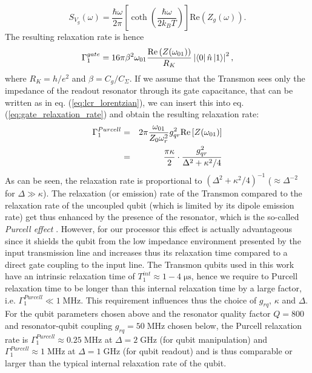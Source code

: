 %
\begin{equation}
S_{V_g}(\omega) = \frac{\hbar\omega}{2\pi}\left[\coth{\left(\frac{\hbar \omega}{2 k_B T}\right)}\right]\mathrm{Re}\left(Z_g(\omega)\right).
\end{equation}
%
The resulting relaxation rate is hence
%
\begin{equation}
\Gamma_1^{gate} = 16\pi\beta^2 \omega_{01} \frac{\mathrm{Re}\left(Z(\omega_{01})\right)}{R_K}\left|\left< 0 \right|\hat{n}\left| 1 \right>\right|^2, \label{eq:gate_relaxation_rate}
\end{equation}
%
where $R_K = h/e^2$ and $\beta=C_g/C_\Sigma$. If we assume that the Transmon sees only the impedance of the readout resonator through its gate capacitance, that can be written as in eq. (\ref{eq:lcr_lorentzian}), we can insert this into eq. (\ref{eq:gate_relaxation_rate}) and obtain the resulting relaxation rate:
%
\begin{eqnarray}
\Gamma_1^{Purcell} & = & 2\pi\frac{\omega_{01}}{Z_0 \omega_r^2}g_{qr}^2 \mathrm{Re}\left[Z(\omega_{01})\right] \notag \\
                & = & \frac{\pi\kappa}{2}\cdot\frac{g_{qr}^2}{\Delta^2+\kappa^2/4} \label{eq:purcell_rate}
\end{eqnarray}
%
As can be seen, the relaxation rate is proportional to $(\Delta^2+\kappa^2/4)^{-1}$ ($\approx\Delta^{-2}$ for $\Delta \gg \kappa$). The relaxation (or emission) rate of the Transmon compared to the relaxation rate of the uncoupled qubit (which is limited by its dipole emission rate) get thus enhanced by the presence of the resonator, which is the so-called {\it Purcell effect} \citep{purcell_spontaneous_1946}. However, for our processor this effect is actually advantageous since it shields the qubit from the low impedance environment presented by the input transmission line and increases thus its relaxation time compared to a direct gate coupling to the input line. The Transmon qubits used in this work have an intrinsic relaxation time of $T_1^{int}\approx 1-4 \; \mathrm{\mu s}$, hence we require to Purcell relaxation time to be longer than this internal relaxation time by a large factor, i.e. $\Gamma_1^{Purcell}\ll 1\;\mathrm{MHz}$. This requirement influences thus the choice of $g_{rq}$, $\kappa$ and $\Delta$. For the qubit parameters chosen above and the resonator quality factor $Q=800$ and resonator-qubit coupling $g_{rq}=50\;\mathrm{MHz}$ chosen below, the Purcell relaxation rate is $\Gamma_1^{Purcell}\approx 0.25\;\mathrm{MHz}$ at $\Delta = 2\;\mathrm{GHz}$ (for qubit manipulation) and $\Gamma_1^{Purcell}\approx 1\;\mathrm{MHz}$ at $\Delta = 1\;\mathrm{GHz}$ (for qubit readout) and is thus comparable or larger than the typical internal relaxation rate of the qubit.
 
